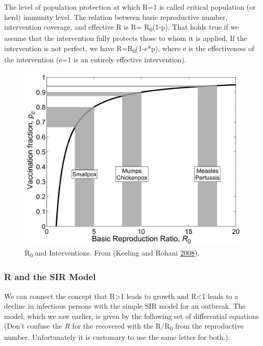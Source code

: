 \documentclass[]{book}
\theoremstyle{definition}
\theoremstyle{definition}
\theoremstyle{definition}
\theoremstyle{remark}
\begin{document}
The level of population protection at which R=1 is called critical
population (or herd) immunity level. The relation between basic
reproductive number, intervention coverage, and effective R is R=
R\textsubscript{0}(1-p). That holds true if we assume that the
intervention fully protects those to whom it is applied. If the
intervention is not perfect, we have R=R\textsubscript{0}(1-e*p), where
e is the effectiveness of the intervention (e=1 is an entirely effective
intervention).

\begin{figure}
\centering
\includegraphics{./images/kr-R0intervention.png}
\caption{\label{fig:krR0intervention}R\textsubscript{0} and Interventions.
From (Keeling and Rohani \protect\hyperlink{ref-keeling08}{2008}).}
\end{figure}

\hypertarget{myadvancedbox}{%
\subsubsection{R and the SIR Model}\label{myadvancedbox}}

We can connect the concept that R\textgreater{}1 leads to growth and
R\textless{}1 leads to a decline in infectious persons with the simple
SIR model for an outbreak. The model, which we saw earlier, is given by
the following set of differential equations (Don't confuse the \emph{R}
for the recovered with the R/R\textsubscript{0} from the reproductive
number. Unfortunately it is customary to use the same letter for both.):
\end{document}
